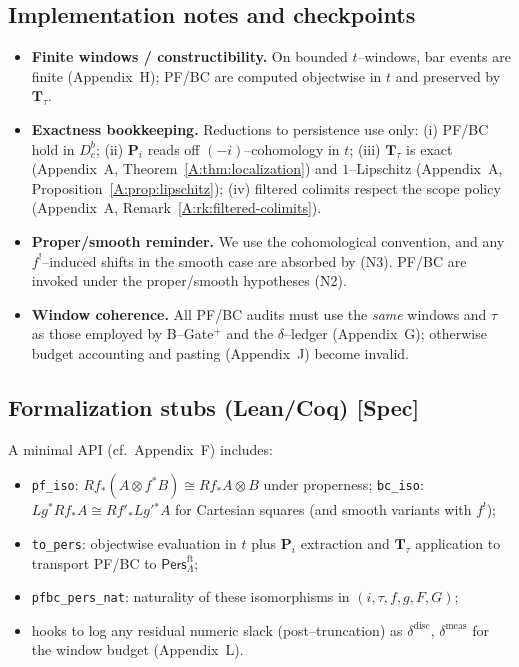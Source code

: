 \documentclass[11pt]{article}
\numberwithin{equation}{section}
\theoremstyle{plain}
\theoremstyle{definition}
\theoremstyle{remark}
\newcommand{\Pers}{\mathsf{Pers}}
\theoremstyle{plain}
\theoremstyle{definition}
\numberwithin{equation}{section}
\theoremstyle{definition}
\numberwithin{equation}{section}
\theoremstyle{plain}
\theoremstyle{definition}
\theoremstyle{remark}
\begin{document}
\subsection{Implementation notes and checkpoints}
\label{N:impl}
\begin{itemize}\itemsep0.35em
  \item \textbf{Finite windows / constructibility.} On bounded \(t\)–windows, bar events are finite (Appendix~H); PF/BC are computed objectwise in \(t\) and preserved by \(\mathbf{T}_\tau\).
  \item \textbf{Exactness bookkeeping.} Reductions to persistence use only: (i) PF/BC hold in \(D^b_c\); (ii) \(\mathbf{P}_i\) reads off \((-i)\)–cohomology in \(t\); (iii) \(\mathbf{T}_\tau\) is exact (Appendix~A, Theorem~\ref{A:thm:localization}) and \(1\)–Lipschitz (Appendix~A, Proposition~\ref{A:prop:lipschitz}); (iv) filtered colimits respect the scope policy (Appendix~A, Remark~\ref{A:rk:filtered-colimits}).
  \item \textbf{Proper/smooth reminder.} We use the cohomological convention, and any \(f^!\)–induced shifts in the smooth case are absorbed by (N3). PF/BC are invoked under the proper/smooth hypotheses (N2).
  \item \textbf{Window coherence.} All PF/BC audits must use the \emph{same} windows and \(\tau\) as those employed by B–Gate\(^{+}\) and the \(\delta\)–ledger (Appendix~G); otherwise budget accounting and pasting (Appendix~J) become invalid.
\end{itemize}

\subsection{Formalization stubs (Lean/Coq) [Spec]}
\label{N:formal}
A minimal API (cf.\ Appendix~F) includes:
\begin{itemize}\itemsep0.25em
  \item \texttt{pf\_iso}: \(Rf_\ast(A\otimes f^\ast B)\cong Rf_\ast A\otimes B\) under properness; \texttt{bc\_iso}: \(Lg^\ast Rf_\ast A\cong Rf'_\ast Lg'{}^\ast A\) for Cartesian squares (and smooth variants with \(f^!\));
  \item \texttt{to\_pers}: objectwise evaluation in \(t\) plus \(\mathbf{P}_i\) extraction and \(\mathbf{T}_\tau\) application to transport PF/BC to \(\Pers^{\mathrm{ft}}_\Lambda\);
  \item \texttt{pfbc\_pers\_nat}: naturality of these isomorphisms in \((i,\tau,f,g,F,G)\);
  \item hooks to log any residual numeric slack (post–truncation) as \(\delta^{\mathrm{disc}}\), \(\delta^{\mathrm{meas}}\) for the window budget (Appendix~L).
\end{itemize}
\end{document}
